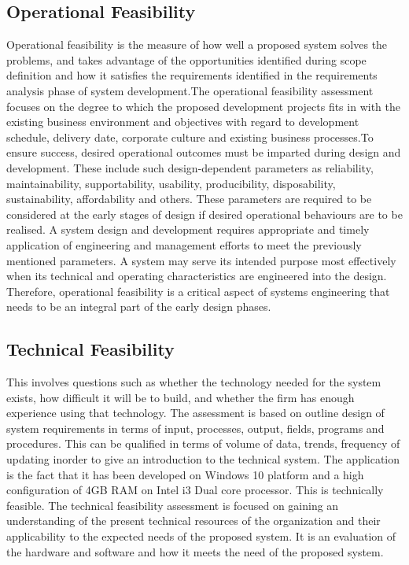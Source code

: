 \documentclass[12pt, a4paper]{report}
\begin{document}
\subsection{Operational Feasibility}

\par Operational feasibility is the measure of how well a proposed system solves the problems, and takes
advantage of the opportunities identified during scope definition and how it satisfies the
requirements identified in the requirements analysis phase of system development.The operational
feasibility assessment focuses on the degree to which the proposed development projects fits in with
the existing business environment and objectives with regard to development schedule, delivery
date, corporate culture and existing business processes.To ensure success, desired operational
outcomes must be imparted during design and development. These include such design-dependent
parameters as reliability, maintainability, supportability, usability, producibility, disposability,
sustainability, affordability and others. These parameters are required to be considered at the early
stages of design if desired operational behaviours are to be realised. A system design and
development requires appropriate and timely application of engineering and management efforts to
meet the previously mentioned parameters. A system may serve its intended purpose most
effectively when its technical and operating characteristics are engineered into the design.
Therefore, operational feasibility is a critical aspect of systems engineering that needs to be an integral part of the early design phases.

\newpage
\subsection{Technical Feasibility}

\par This involves questions such as whether the technology needed for the system exists, how difficult
it will be to build, and whether the firm has enough experience using that technology. The
assessment is based on outline design of system requirements in terms of input, processes, output,
fields, programs and procedures. This can be qualified in terms of volume of data, trends, frequency
of updating inorder to give an introduction to the technical system. The application is the fact that it
has been developed on Windows 10 platform and a high configuration of 4GB RAM on Intel
i3 Dual core processor. This is technically feasible. The technical feasibility assessment is
focused on gaining an understanding of the present technical resources of the organization and their
applicability to the expected needs of the proposed system. It is an evaluation of the hardware and
software and how it meets the need of the proposed system.
\end{document}
